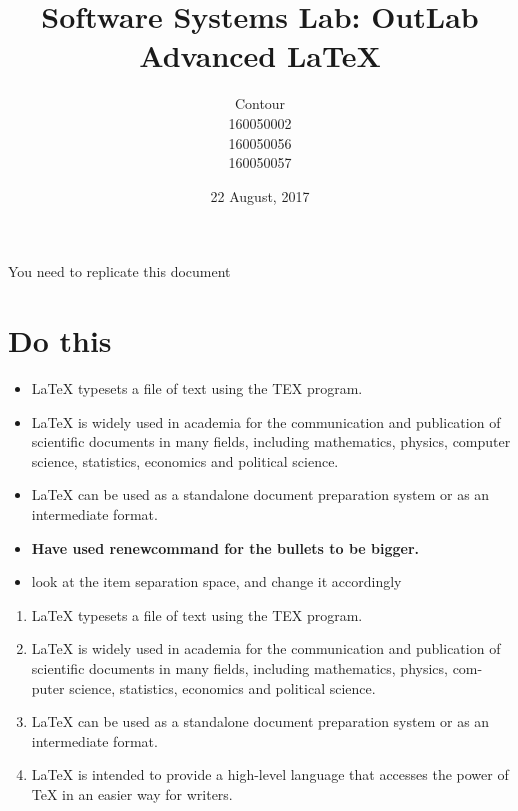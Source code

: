 \documentclass[titlepage]{article}
\begin{document}
\title{ \huge {\textbf{Software Systems Lab: OutLab \\ Advanced \LaTeX}}}
\author{Contour \\ 160050002 \\ 160050056 \\ 160050057}
\date{22 August, 2017}
\maketitle

\tableofcontents

\newpage

You need to replicate this document

\section{\textbf{Do this}}

\begin{itemize}
    \setlength\itemsep{2em}
    \item {\LaTeX} typesets a file of text using the TEX program.
    \item {\LaTeX} is widely used in academia for the communication and publication of scientific documents in many fields, including mathematics, physics, computer science, statistics, economics and political science.
    \item {\LaTeX} can be used as a standalone document preparation system or as an intermediate format.
    \item \textbf{Have used renewcommand for the bullets to be bigger.}
    \item look at the item separation space, and change it accordingly
\end{itemize}
\begin{enumerate}[label*=\Roman*]
    \setlength{\itemindent}{-1em}
    \item {\LaTeX} typesets a file of text using the TEX program.
    \item {\LaTeX} is widely used in academia for the communication and publication of scientific documents in many fields, including mathematics, physics, com- puter science, statistics, economics and political science.
    \item   {\LaTeX} can be used as a standalone document preparation system or as an intermediate format.
    \item {\LaTeX} is intended to provide a high-level language that accesses the power of TeX in an easier way for writers.
\end{enumerate}
\end{document}
